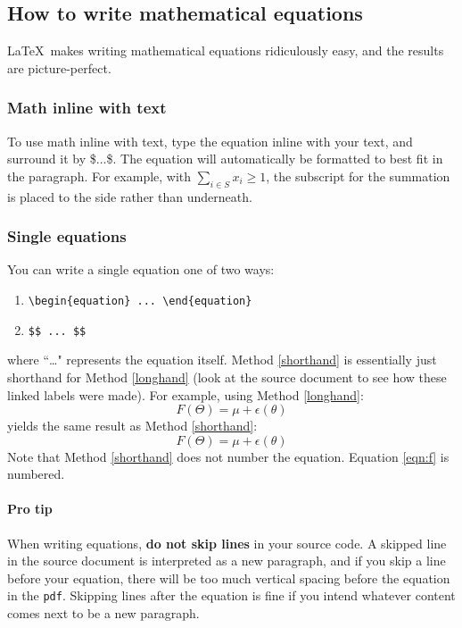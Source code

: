 \documentclass[12pt]{article}
\begin{document}
\subsection{How to write mathematical equations}
\LaTeX\ makes writing mathematical equations ridiculously easy, and the results are picture-perfect. 

\subsubsection{Math inline with text}
To use math inline with text, type the equation inline with your text, and surround it by \$$\ldots$\$. The equation will automatically be formatted to best fit in the paragraph. For example, with $\sum_{i \in S} x_i \geq 1$, the subscript for the summation is placed to the side rather than underneath.


\subsubsection{Single equations}
You can write a single equation one of two ways:
\begin{enumerate}
\item \label{longhand} \verb!\begin{equation} ... \end{equation}!
\item \label{shorthand} \verb!$$ ... $$!
\end{enumerate}
where ``\ldots" represents the equation itself. Method \ref{shorthand} is essentially just shorthand for Method \ref{longhand} (look at the source document to see how these linked labels were made). For example, using Method \ref{longhand}:
\begin{equation} 
\label{eqn:f} F(\Theta) = \mu + \epsilon(\theta)
\end{equation}
yields the same result as Method \ref{shorthand}:
$$ F(\Theta) = \mu + \epsilon(\theta) $$
Note that Method \ref{shorthand} does not number the equation. Equation \ref{eqn:f} is numbered.

\paragraph{Pro tip} When writing equations, \textbf{do not skip lines} in your source code. A skipped line in the source document is interpreted as a new paragraph, and if you skip a line before your equation, there will be too much vertical spacing before the equation in the \texttt{pdf}. Skipping lines after the equation is fine if you intend whatever content comes next to be a new paragraph.
\end{document}
